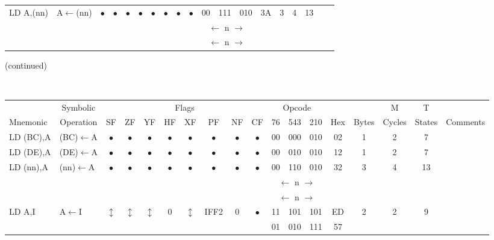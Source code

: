 \documentclass[oneside,a4paper]{book}
\begin{document}
{\begin{tabular}{llc@{ }c@{ }c@{ }c@{ }c@{ }c@{ }c@{ }cc@{ }c@{ }cccccll}
LD A,(nn) & A$\leftarrow$(nn) & 
	$\bullet$ & $\bullet$ & $\bullet$ & $\bullet$ & $\bullet$ & $\bullet$ & $\bullet$ & $\bullet$ & 00 & 111 & 010
	& 3A & 3 & 4 & 13 & & \\
\multicolumn{10}{c}{} & \multicolumn{3}{c}{$\leftarrow$ n $\rightarrow$} & \multicolumn{4}{c}{} & & \\
\multicolumn{10}{c}{} & \multicolumn{3}{c}{$\leftarrow$ n $\rightarrow$} & \multicolumn{4}{c}{} & & \\ \hline

\end{tabular}
}

(continued)\\
{\tt \scriptsize \setlength{\fboxsep}{0.25mm}
\setlength{\tabcolsep}{1mm}
\begin{tabular}{llc@{ }c@{ }c@{ }c@{ }c@{ }c@{ }c@{ }cc@{ }c@{ }cccccll}\hline
 & \multicolumn{1}{c}{Symbolic} & \multicolumn{8}{c}{Flags} & \multicolumn{3}{c}{Opcode} & & & M & T & \\
Mnemonic & \multicolumn{1}{c}{Operation} & SF & ZF & YF & HF & XF & PF & NF & CF & 76 & 543 & 210 
	& Hex & Bytes & Cycles & States & \multicolumn{2}{l}{Comments} \\ \hline

LD (BC),A & (BC)$\leftarrow$A & 
	$\bullet$ & $\bullet$ & $\bullet$ & $\bullet$ & $\bullet$ & $\bullet$ & $\bullet$ & $\bullet$ & 00 & 000 & 010
	& 02 & 1 & 2 & 7 & & \\

LD (DE),A & (DE)$\leftarrow$A & 
	$\bullet$ & $\bullet$ & $\bullet$ & $\bullet$ & $\bullet$ & $\bullet$ & $\bullet$ & $\bullet$ & 00 & 010 & 010
	& 12 & 1 & 2 & 7 & & \\

LD (nn),A & (nn)$\leftarrow$A & 
	$\bullet$ & $\bullet$ & $\bullet$ & $\bullet$ & $\bullet$ & $\bullet$ & $\bullet$ & $\bullet$ & 00 & 110 & 010
	& 32 & 3 & 4 & 13 & & \\
\multicolumn{10}{c}{} & \multicolumn{3}{c}{$\leftarrow$ n $\rightarrow$} & \multicolumn{4}{c}{} & & \\
\multicolumn{10}{c}{} & \multicolumn{3}{c}{$\leftarrow$ n $\rightarrow$} & \multicolumn{4}{c}{} & & \\

LD A,I & A$\leftarrow$I & 
	$\updownarrow$ & $\updownarrow$ & $\updownarrow$ & 0 & $\updownarrow$ & IFF2 & 0 & $\bullet$ & 11 & 101 & 101 
	& ED & 2 & 2 & 9 & & \\ 
\multicolumn{10}{c}{} & 01 & 010 & 111 & 57 & \multicolumn{3}{c}{} & & \\


\end{tabular}}
\end{document}

